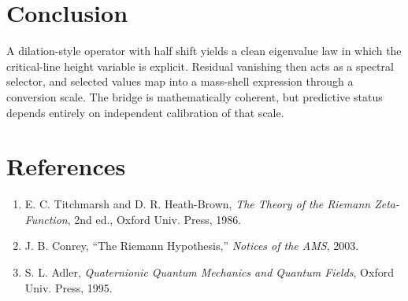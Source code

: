 \documentclass[11pt]{article}
\begin{document}
\section{Conclusion}
A dilation-style operator with half shift yields a clean eigenvalue law in which the critical-line height variable is explicit. Residual vanishing then acts as a spectral selector, and selected values map into a mass-shell expression through a conversion scale. The bridge is mathematically coherent, but predictive status depends entirely on independent calibration of that scale.

\section*{References}
\begin{enumerate}
\item E. C. Titchmarsh and D. R. Heath-Brown, \emph{The Theory of the Riemann Zeta-Function}, 2nd ed., Oxford Univ. Press, 1986.
\item J. B. Conrey, ``The Riemann Hypothesis,'' \emph{Notices of the AMS}, 2003.
\item S. L. Adler, \emph{Quaternionic Quantum Mechanics and Quantum Fields}, Oxford Univ. Press, 1995.
\end{enumerate}
\end{document}
